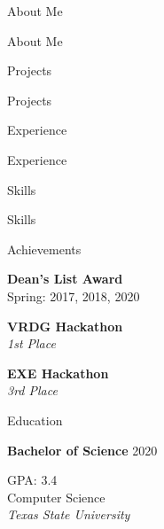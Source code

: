 \documentclass[letterpaper, 12pt]{resume}
\begin{document}
\begin{multicols}{2}

\begin{rSection}{About Me}
\color{black}
\item About Me
\end{rSection}

\begin{rSection}{Projects}
\color{black}
\item Projects
\end{rSection}

\begin{rSection}{Experience}
\color{black}
\item Experience
\end{rSection}

\begin{rSection}{Skills}
\color{black}
\item Skills
\end{rSection}

\begin{rSection}{Achievements}
\color{black}

	\begin{flushleft}
	{\bf Dean's List Award} \\
	{\raggedleft Spring: 2017, 2018, 2020 \\ }
	\end{flushleft}
	
	\begin{flushleft}
	{\bf VRDG Hackathon} \\
	{\raggedleft \em 1st Place \\}
	\end{flushleft}
	
	\begin{flushleft}
	{\bf EXE Hackathon} \\
	{\raggedleft \em 3rd Place\\}
	\end{flushleft}
	
\end{rSection}


\begin{rSection}{Education}
\color{black}

	\begin{flushleft}
	{{\bf Bachelor of Science} \hfill 2020 } \\
	\end{flushleft}
	{\raggedleft GPA: 3.4 \\ Computer Science \\ {\em Texas State University} \\}
	
\end{rSection}


\end{multicols}
\end{document}
